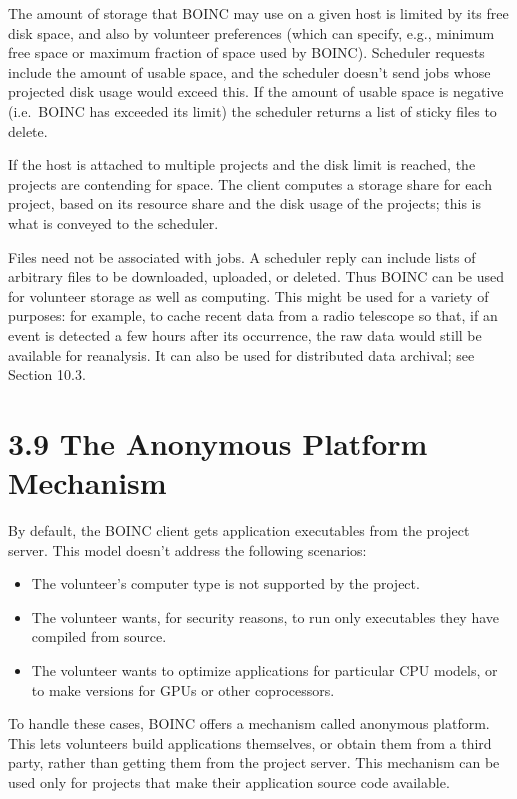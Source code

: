 \documentclass[
]{article}
\providecommand{\tightlist}{%
  \setlength{\itemsep}{0pt}\setlength{\parskip}{0pt}}
\begin{document}
The amount of storage that BOINC may use on a given host is limited by
its free disk space, and also by volunteer preferences (which can
specify, e.g., minimum free space or maximum fraction of space used by
BOINC). Scheduler requests include the amount of usable space, and the
scheduler doesn't send jobs whose projected disk usage would exceed
this. If the amount of usable space is negative (i.e.~BOINC has exceeded
its limit) the scheduler returns a list of sticky files to delete.

If the host is attached to multiple projects and the disk limit is
reached, the projects are contending for space. The client computes a
storage share for each project, based on its resource share and the disk
usage of the projects; this is what is conveyed to the scheduler.

Files need not be associated with jobs. A scheduler reply can include
lists of arbitrary files to be downloaded, uploaded, or deleted. Thus
BOINC can be used for volunteer storage as well as computing. This might
be used for a variety of purposes: for example, to cache recent data
from a radio telescope so that, if an event is detected a few hours
after its occurrence, the raw data would still be available for
reanalysis. It can also be used for distributed data archival; see
Section 10.3.

\section{3.9 The Anonymous Platform
Mechanism}\label{the-anonymous-platform-mechanism}

By default, the BOINC client gets application executables from the
project server. This model doesn't address the following scenarios:

\begin{itemize}
\tightlist
\item
  The volunteer's computer type is not supported by the project.\\
\item
  The volunteer wants, for security reasons, to run only executables
  they have compiled from source.\\
\item
  The volunteer wants to optimize applications for particular CPU
  models, or to make versions for GPUs or other coprocessors.
\end{itemize}

To handle these cases, BOINC offers a mechanism called anonymous
platform. This lets volunteers build applications themselves, or obtain
them from a third party, rather than getting them from the project
server. This mechanism can be used only for projects that make their
application source code available.
\end{document}
